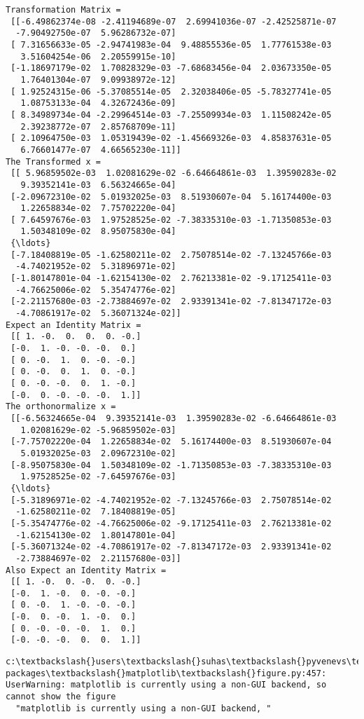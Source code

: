 \documentclass[11pt]{article}
\begin{document}
\begin{Verbatim}[commandchars=\\\{\}]
Transformation Matrix = 
 [[-6.49862374e-08 -2.41194689e-07  2.69941036e-07 -2.42525871e-07
  -7.90492750e-07  5.96286732e-07]
 [ 7.31656633e-05 -2.94741983e-04  9.48855536e-05  1.77761538e-03
   3.51604254e-06  2.20559915e-10]
 [-1.18697179e-02  1.70828329e-03 -7.68683456e-04  2.03673350e-05
   1.76401304e-07  9.09938972e-12]
 [ 1.92524315e-06 -5.37085514e-05  2.32038406e-05 -5.78327741e-05
   1.08753133e-04  4.32672436e-09]
 [ 8.34989734e-04 -2.29964514e-03 -7.25509934e-03  1.11508242e-05
   2.39238772e-07  2.85768709e-11]
 [ 2.10964750e-03  1.05319439e-02 -1.45669326e-03  4.85837631e-05
   6.76601477e-07  4.66565230e-11]]
The Transformed x = 
 [[ 5.96859502e-03  1.02081629e-02 -6.64664861e-03  1.39590283e-02
   9.39352141e-03  6.56324665e-04]
 [-2.09672310e-02  5.01932025e-03  8.51930607e-04  5.16174400e-03
   1.22658834e-02  7.75702220e-04]
 [ 7.64597676e-03  1.97528525e-02 -7.38335310e-03 -1.71350853e-03
   1.50348109e-02  8.95075830e-04]
 {\ldots}
 [-7.18408819e-05 -1.62580211e-02  2.75078514e-02 -7.13245766e-03
  -4.74021952e-02  5.31896971e-02]
 [-1.80147801e-04 -1.62154130e-02  2.76213381e-02 -9.17125411e-03
  -4.76625006e-02  5.35474776e-02]
 [-2.21157680e-03 -2.73884697e-02  2.93391341e-02 -7.81347172e-03
  -4.70861917e-02  5.36071324e-02]]
Expect an Identity Matrix = 
 [[ 1. -0.  0.  0.  0. -0.]
 [-0.  1. -0. -0. -0.  0.]
 [ 0. -0.  1.  0. -0. -0.]
 [ 0. -0.  0.  1.  0. -0.]
 [ 0. -0. -0.  0.  1. -0.]
 [-0.  0. -0. -0. -0.  1.]]
The orthonormalize x = 
 [[-6.56324665e-04  9.39352141e-03  1.39590283e-02 -6.64664861e-03
   1.02081629e-02 -5.96859502e-03]
 [-7.75702220e-04  1.22658834e-02  5.16174400e-03  8.51930607e-04
   5.01932025e-03  2.09672310e-02]
 [-8.95075830e-04  1.50348109e-02 -1.71350853e-03 -7.38335310e-03
   1.97528525e-02 -7.64597676e-03]
 {\ldots}
 [-5.31896971e-02 -4.74021952e-02 -7.13245766e-03  2.75078514e-02
  -1.62580211e-02  7.18408819e-05]
 [-5.35474776e-02 -4.76625006e-02 -9.17125411e-03  2.76213381e-02
  -1.62154130e-02  1.80147801e-04]
 [-5.36071324e-02 -4.70861917e-02 -7.81347172e-03  2.93391341e-02
  -2.73884697e-02  2.21157680e-03]]
Also Expect an Identity Matrix = 
 [[ 1. -0.  0. -0.  0. -0.]
 [-0.  1. -0.  0. -0. -0.]
 [ 0. -0.  1. -0. -0. -0.]
 [-0.  0. -0.  1. -0.  0.]
 [ 0. -0. -0. -0.  1.  0.]
 [-0. -0. -0.  0.  0.  1.]]

    \end{Verbatim}

    \begin{Verbatim}[commandchars=\\\{\}]
c:\textbackslash{}users\textbackslash{}suhas\textbackslash{}pyvenevs\textbackslash{}fall\textbackslash{}lib\textbackslash{}site-packages\textbackslash{}matplotlib\textbackslash{}figure.py:457: UserWarning: matplotlib is currently using a non-GUI backend, so cannot show the figure
  "matplotlib is currently using a non-GUI backend, "

    \end{Verbatim}
\end{document}
